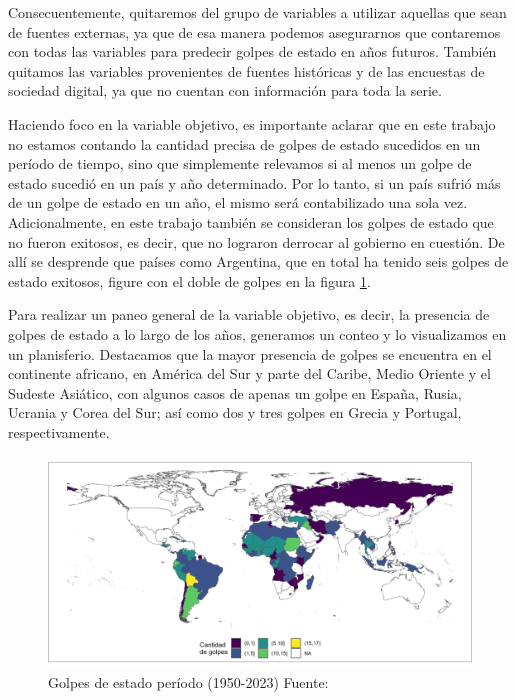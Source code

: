 \documentclass{article}
\begin{document}
Consecuentemente, quitaremos del grupo de variables a utilizar aquellas que sean de
fuentes externas, ya que de esa manera podemos asegurarnos que contaremos con todas
las variables para predecir golpes de estado en años futuros. También quitamos las
variables provenientes de fuentes históricas y de las encuestas de sociedad digital,
ya que no cuentan con información para toda la serie.

Haciendo foco en la variable objetivo, es importante aclarar que en este trabajo no 
estamos contando la cantidad precisa
de golpes de estado sucedidos en un período de tiempo, sino que simplemente relevamos
si al menos un golpe de estado sucedió en un país y año determinado. Por lo tanto, si
un país sufrió más de un golpe de estado en un año, el mismo será contabilizado una
sola vez. Adicionalmente, en este trabajo también se consideran los golpes de estado
que no fueron exitosos, es decir, que no lograron derrocar al gobierno en cuestión. 
De allí se desprende que países como Argentina, que en total ha tenido seis golpes de 
estado exitosos, figure con el doble de golpes en la figura \ref{fig::mapa_golpes}.

Para realizar un paneo general de la variable objetivo, es decir, la presencia de
golpes de estado a lo largo de los años, generamos un conteo y lo visualizamos en un 
planisferio. Destacamos que la mayor presencia de golpes se encuentra en el 
continente africano, en América del Sur y parte del Caribe, Medio Oriente y el 
Sudeste Asiático, con algunos casos de apenas un golpe en España, Rusia, Ucrania 
y Corea del Sur; así como dos y tres golpes en Grecia y Portugal, respectivamente.

\begin{figure}[H]
  \centering  
  \includegraphics[width=1\textwidth]{2_golpes.png}
  \caption{Golpes de estado período (1950-2023) Fuente: \cite{Pow11} \label{fig::mapa_golpes}}
\end{figure}
\end{document}
